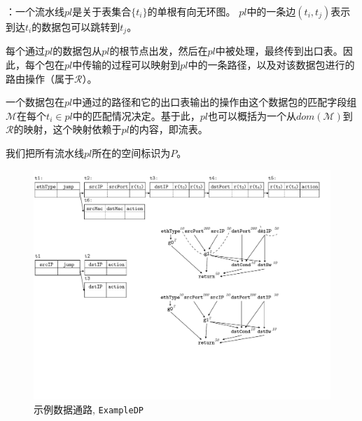 \documentclass{ctexart}
\newcommand{\exampledp}{\texttt{ExampleDP}}
\newcommand{\para}[1]{\smallskip\noindent {\bf #1}}
\begin{document}
\para{流水线}：一个流水线$pl$是关于表集合$\{t_i\}$的单根有向无环图。 $pl$中的一条边$(t_i, t_j)$表示到达$t_i$的数据包可以跳转到$t_j$。


每个通过$pl$的数据包从$pl$的根节点出发，然后在$pl$中被处理，最终传到出口表。因此，每个包在$pl$中传输的过程可以映射到$pl$中的一条路径，以及对该数据包进行的路由操作（属于$\mathcal{R}$）。

一个数据包在$pl$中通过的路径和它的出口表输出的操作由这个数据包的匹配字段组$\mathcal{M}$在每个$t_i \in pl$中的匹配情况决定。基于此，$pl$也可以概括为一个从$dom(\mathcal{M})$到$\mathcal{R}$的映射，这个映射依赖于$pl$的内容，即流表。

我们把所有流水线$pl$所在的空间标识为$P$。





\begin{figure}[tbh]
    \centering
    \vspace{-1mm}
    \includegraphics[scale = 0.6]{figures/figure3.pdf}
    \vspace{-2mm}
    \caption{示例数据通路, \exampledp}
    \label{cap:fig:swPipeline}
    \vspace{-2mm}
\end{figure}
\end{document}

